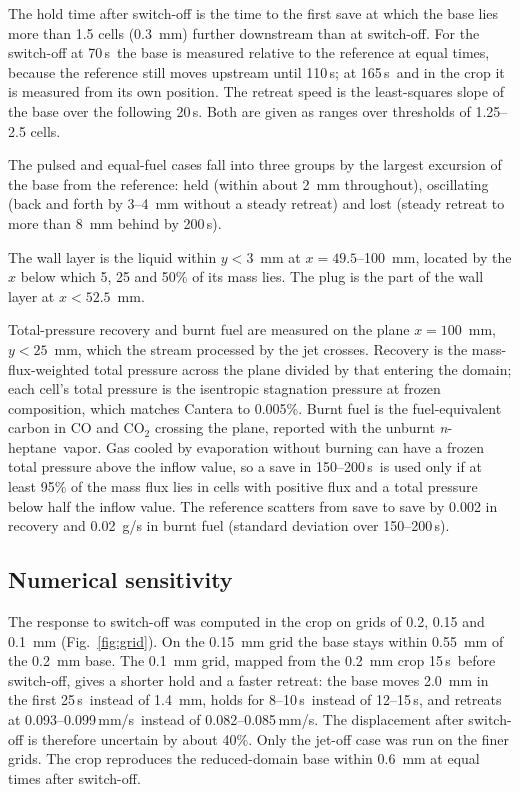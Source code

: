 \documentclass[aip,pof,preprint,amsmath,amssymb]{revtex4-2}
\newcommand{\us}{\,\textmu s}
\newcommand{\mmus}{\,mm/\textmu s}
\newcommand{\nh}{\textit{n}-heptane}
\begin{document}
The hold time after switch-off is the time to the first save at which the base lies more than 1.5 cells (0.3~mm) further downstream than at switch-off. For the switch-off at 70\us\ the base is measured relative to the reference at equal times, because the reference still moves upstream until 110\us; at 165\us\ and in the crop it is measured from its own position. The retreat speed is the least-squares slope of the base over the following 20\us. Both are given as ranges over thresholds of 1.25--2.5 cells.

The pulsed and equal-fuel cases fall into three groups by the largest excursion of the base from the reference: held (within about 2~mm throughout), oscillating (back and forth by 3--4~mm without a steady retreat) and lost (steady retreat to more than 8~mm behind by 200\us).

The wall layer is the liquid within $y < 3$~mm at $x = 49.5$--100~mm, located by the $x$ below which 5, 25 and 50\% of its mass lies. The plug is the part of the wall layer at $x < 52.5$~mm.

Total-pressure recovery and burnt fuel are measured on the plane $x = 100$~mm, $y < 25$~mm, which the stream processed by the jet crosses. Recovery is the mass-flux-weighted total pressure across the plane divided by that entering the domain; each cell's total pressure is the isentropic stagnation pressure at frozen composition, which matches Cantera to 0.005\%. Burnt fuel is the fuel-equivalent carbon in CO and CO$_2$ crossing the plane, reported with the unburnt \nh\ vapor. Gas cooled by evaporation without burning can have a frozen total pressure above the inflow value, so a save in 150--200\us\ is used only if at least 95\% of the mass flux lies in cells with positive flux and a total pressure below half the inflow value. The reference scatters from save to save by 0.002 in recovery and 0.02~g/s in burnt fuel (standard deviation over 150--200\us).

\subsection{Numerical sensitivity}\label{sec:robust}

The response to switch-off was computed in the crop on grids of 0.2, 0.15 and 0.1~mm (Fig.~\ref{fig:grid}). On the 0.15~mm grid the base stays within 0.55~mm of the 0.2~mm base. The 0.1~mm grid, mapped from the 0.2~mm crop 15\us\ before switch-off, gives a shorter hold and a faster retreat: the base moves 2.0~mm in the first 25\us\ instead of 1.4~mm, holds for 8--10\us\ instead of 12--15\us, and retreats at 0.093--0.099\mmus\ instead of 0.082--0.085\mmus. The displacement after switch-off is therefore uncertain by about 40\%. Only the jet-off case was run on the finer grids. The crop reproduces the reduced-domain base within 0.6~mm at equal times after switch-off.
\end{document}
